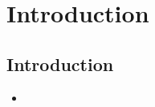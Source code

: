\documentclass[../notes.tex]{subfiles}
\begin{document}
\chapter{Introduction}
\section{Introduction}
\begin{itemize}
    \item {}
\end{itemize}
\end{document}
